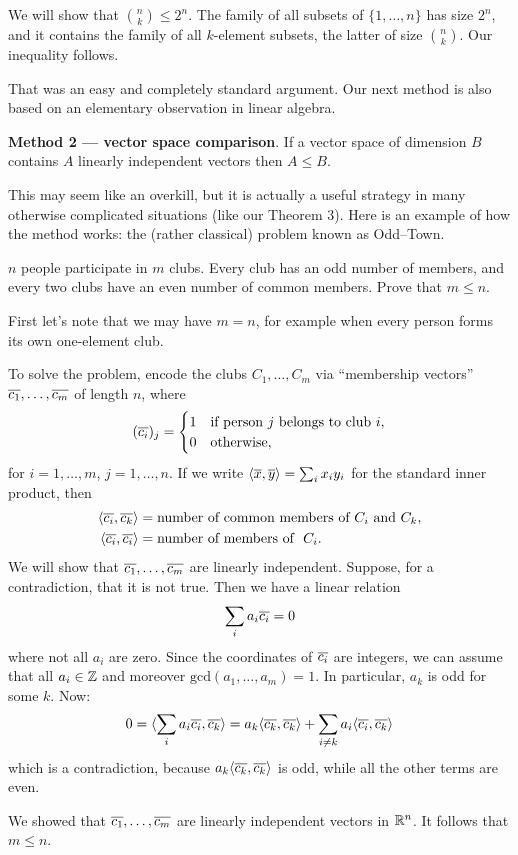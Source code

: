 \begin{example} We will show that ${n\choose k}\leq 2^n$. The family of all subsets of $\{1,\ldots,n\}$ has size $2^n$, and it contains the family of all $k$-element subsets, the latter of size ${n\choose k}$. Our inequality follows.
\end{example}

That was an easy and completely standard argument. Our next method is also based on an elementary observation in linear algebra.

\smallskip
\noindent
\textbf{Method 2 --- vector space comparison}. If a vector space of dimension $B$ contains $A$ linearly independent vectors then $A\leq B$.

\smallskip
This may seem like an overkill, but it is actually a  useful strategy in many otherwise complicated situations (like our Theorem 3). Here is an example of how the method works: the (rather classical) problem known as Odd--Town.

\begin{example}
$n$ people participate in $m$ clubs. Every club has an odd number of members, and every two clubs have an even number of common members. Prove that $m\leq n$.

First let's note that we may have $m=n$, for example when every person forms its own one-element club.

To solve the problem, encode the clubs $C_1,\ldots,C_m$ via ``membership vectors'' $\overline{c_1},\ldots,\overline{c_m}$ of length $n$, where
$$(\overline{c_i})_j=
\begin{cases}
1 & \textrm{if person}\ j\ \textrm{belongs to club}\ i,\\
0 & \textrm{otherwise},
\end{cases}
$$
for $i=1,\ldots,m$, $j=1,\ldots,n$. If we write $\langle\overline{x},\overline{y}\rangle=\sum_ix_iy_i$ for the standard inner product, then
\begin{align*}
\langle \oo{c_i},\oo{c_k}\rangle &= \textrm{number of common members of}\ C_i\ \textrm{and}\ C_k,\\
\langle \oo{c_i},\oo{c_i}\rangle &= \textrm{number of members of }\ C_i.
\end{align*}
We will show that $\overline{c_1},\ldots,\overline{c_m}$ are linearly independent. Suppose, for a contradiction, that it is not true. Then we have a linear relation
$$\sum_ia_i\overline{c_i}=0$$
where not all $a_i$ are zero. Since the coordinates of $\overline{c_i}$ are integers, we can assume that all $a_i\in \mathbb{Z}$ and moreover $\textrm{gcd}(a_1,\ldots,a_m)=1$. In particular, $a_k$ is odd for some $k$. Now:
$$0=\langle\sum_ia_i\overline{c_i},\overline{c_k}\rangle=a_k\langle \overline{c_k},\overline{c_k}\rangle+\sum_{i\neq k}a_i\langle \overline{c_i},\overline{c_k}\rangle$$
which is a contradiction, because $a_k\langle\overline{c_k},\overline{c_k}\rangle$ is odd, while all the other terms are even.

We showed that $\overline{c_1},\ldots,\overline{c_m}$ are linearly independent vectors in $\mathbb{R}^n$. It follows that $m\leq n$.
\end{example}

